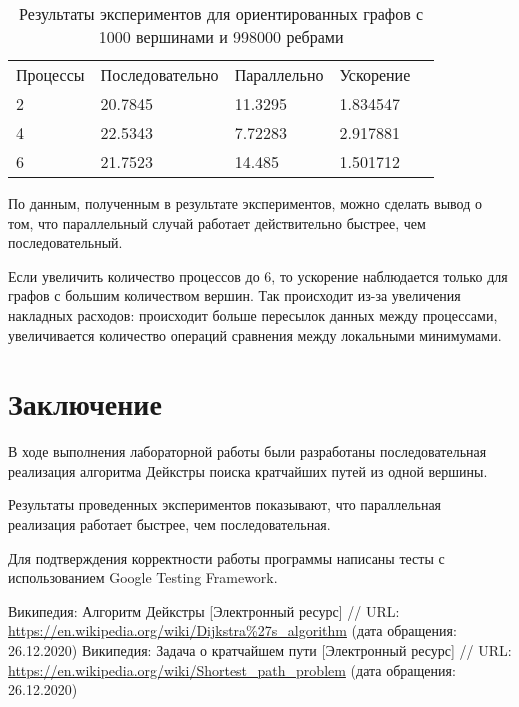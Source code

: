 \documentclass{report}
\begin{document}
\begin{table}[!h]
\caption{Результаты экспериментов для ориентированных графов с 1000 вершинами и 998000 ребрами}
\centering
\begin{tabular}{lllll}
Процессы & Последовательно & Параллельно & Ускорение            \\
2        & 20.7845            & 11.3295        & 1.834547       \\
4        & 22.5343            & 7.72283        & 2.917881       \\
6        & 21.7523            & 14.485        & 1.501712
\end{tabular}
\end{table}

\par По данным, полученным в результате экспериментов, можно сделать вывод о том, что параллельный случай работает действительно быстрее, чем последовательный.
\par Если увеличить количество процессов до 6, то ускорение наблюдается только для графов с большим количеством вершин. Так происходит из-за увеличения накладных расходов: происходит больше пересылок данных между процессами, увеличивается количество операций сравнения между локальными минимумами.
\newpage

\section*{Заключение}
В ходе выполнения лабораторной работы были разработаны последовательная реализация алгоритма Дейкстры поиска кратчайших путей из одной вершины.
\par Результаты проведенных экспериментов показывают, что параллельная реализация работает быстрее, чем последовательная.
\par Для подтверждения корректности работы программы написаны тесты с использованием Google Testing Framework.
\newpage

\begin{thebibliography}{1}
 Википедия: Алгоритм Дейкстры [Электронный ресурс] // URL: \url {https://en.wikipedia.org/wiki/Dijkstra%27s_algorithm} (дата обращения: 26.12.2020)
 Википедия: Задача о кратчайшем пути [Электронный ресурс] // URL: \url {https://en.wikipedia.org/wiki/Shortest_path_problem} (дата обращения: 26.12.2020)
\end{thebibliography}
\newpage
\end{document}
